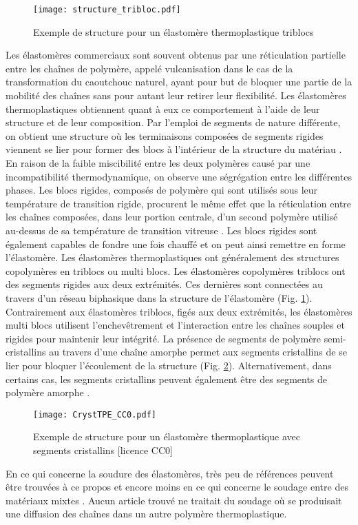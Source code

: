 \begin{figure}[h]
	\centering
	\texttt{[image: structure\_tribloc.pdf]}
	\caption{Exemple de structure pour un élastomère thermoplastique triblocs}
	\label{fig:structure_tribloc}
\end{figure}

Les élastomères commerciaux sont souvent obtenus par une réticulation partielle entre les chaînes de polymère, appelé vulcanisation dans le cas de la transformation du  caoutchouc naturel, ayant pour but de bloquer une partie de la mobilité des chaînes sans pour autant leur retirer leur flexibilité. 
Les élastomères thermoplastiques obtiennent quant à eux ce comportement à l'aide de leur structure et de leur composition. 
Par l'emploi de segments de nature différente, on obtient une structure où les terminaisons composées de segments rigides viennent se lier pour former des blocs à l'intérieur de la structure du matériau \cite{Holden1969}. 
En raison de la faible miscibilité entre les deux polymères causé par une incompatibilité thermodynamique, on observe une ségrégation entre les différentes phases. 
Les blocs rigides, composés de polymère qui sont utilisés sous leur température de transition rigide, procurent le même effet que la réticulation entre les chaînes composées, dans leur portion centrale, d'un second polymère utilisé au-dessus de sa température de transition vitreuse \cite{Holden2002}. 
Les blocs rigides sont également capables de fondre une fois chauffé et on peut ainsi remettre en forme l'élastomère. 
Les élastomères thermoplastiques ont généralement des structures copolymères en triblocs ou multi blocs. 
Les élastomères copolymères triblocs ont des segments rigides aux deux extrémités. 
Ces dernières sont connectées au travers d'un réseau biphasique dans la structure de l'élastomère (Fig. \ref{fig:structure_tribloc}). 
Contrairement aux élastomères triblocs, figés aux deux extrémités, les élastomères multi blocs utilisent l'enchevêtrement et l'interaction entre les chaînes souples et rigides pour maintenir leur intégrité. 
La présence de segments de polymère semi-cristallins au travers d'une chaîne amorphe permet aux segments cristallins de se lier pour bloquer l'écoulement de la structure (Fig. \ref{fig:structure_TPECryst}). 
Alternativement, dans certains cas, les segments cristallins peuvent également être des segments de polymère amorphe \cite{Holden2002}. 

\begin{figure}[h]
	\centering
	\texttt{[image: CrystTPE\_CC0.pdf]}
	\caption{Exemple de structure pour un élastomère thermoplastique avec segments cristallins [licence CC0]}
	\label{fig:structure_TPECryst}
\end{figure}

En ce qui concerne la soudure des élastomères, très peu de références peuvent être trouvées à ce propos et encore moins en ce qui concerne le soudage entre des matériaux mixtes \cite{Chan2016,Hollande1998}. 
Aucun article trouvé ne traitait du soudage où se produisait une diffusion des chaînes dans un autre polymère thermoplastique. 